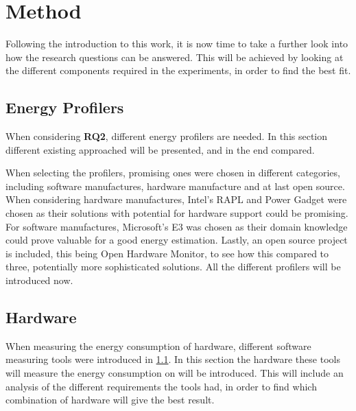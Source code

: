 \chapter{Method}\label{ch:method}

Following the introduction to this work, it is now time to take a further look into how the research questions can be answered. This will be achieved by looking at the different components required in the experiments, in order to find the best fit.

\section{Energy Profilers}\label{sec:energy_profilers}

When considering \textbf{RQ2}, different energy profilers are needed. In this section different existing approached will be presented, and in the end compared.

When selecting the profilers, promising ones were chosen in different categories, including software manufactures, hardware manufacture and at last open source. When considering hardware manufactures, Intel's RAPL and Power Gadget were chosen as their solutions with potential for hardware support could be promising. For software manufactures, Microsoft's E3 was chosen as their domain knowledge could prove valuable for a good energy estimation. Lastly, an open source project is included, this being Open Hardware Monitor, to see how this compared to three, potentially more sophisticated solutions. All the different profilers will be introduced now.







\section{Hardware}\label{sec:hardware}

When measuring the energy consumption of hardware, different software measuring tools were introduced in \cref{sec:energy_profilers}. In this section the hardware these tools will measure the energy consumption on will be introduced. This will include an analysis of the different requirements the tools had, in order to find which combination of hardware will give the best result.


